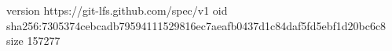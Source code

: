 version https://git-lfs.github.com/spec/v1
oid sha256:7305374cebcadb79594111529816ec7aeafb0437d1c84daf5fd5ebf1d20bc6c8
size 157277

